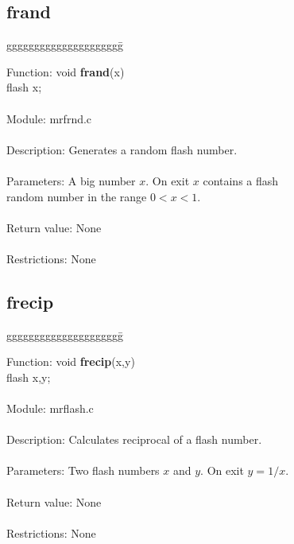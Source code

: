 \subsection{frand}

\begin{tabbing}
ggggggggggggggggggggg\= \kill


      Function:      \>void {\bf frand}(x) \\
                     \>flash x; \\
      \ \\
      Module:        \>mrfrnd.c \\
      \ \\
      Description:   \>Generates a random flash number. \\
      \ \\
      Parameters:    \>A big number $x$. On exit $x$ contains a flash \\
                     \>random number in the range $0<x<1$. \\
      \ \\
      Return value:  \>None \\
      \ \\
      Restrictions:  \>None \\

\end{tabbing}
\pagebreak
\subsection{frecip}

\begin{tabbing}
ggggggggggggggggggggg\= \kill


      Function:      \>void {\bf frecip}(x,y) \\
                     \>flash x,y; \\
      \ \\
      Module:        \>mrflash.c \\
      \ \\
      Description:   \>Calculates reciprocal of a flash number. \\
      \ \\
      Parameters:    \>Two flash numbers $x$ and $y$. On exit $y=1/x$. \\
      \ \\
      Return value:  \>None \\
      \ \\
      Restrictions:  \>None \\

\end{tabbing}

